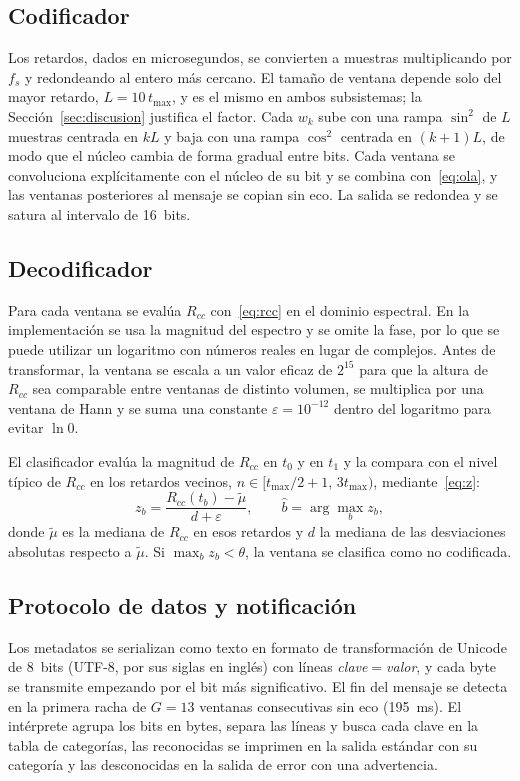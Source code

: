 \documentclass[journal]{IEEEtran}
\begin{document}
\subsection{Codificador}
Los retardos, dados en microsegundos, se convierten a muestras multiplicando por
$f_s$ y redondeando al entero más cercano. El tamaño de ventana depende
solo del mayor retardo, $L=10\,t_{\max}$, y es el mismo en ambos subsistemas;
la Sección~\ref{sec:discusion} justifica el factor. Cada $w_k$ sube con una
rampa $\sin^2$ de $L$ muestras centrada en $kL$ y baja con una rampa $\cos^2$
centrada en $(k+1)L$, de modo que el núcleo cambia de forma gradual entre bits.
Cada ventana se convoluciona explícitamente con el núcleo de su bit y se combina
con~\eqref{eq:ola}, y las ventanas posteriores al mensaje se copian sin eco. La
salida se redondea y se satura al intervalo de 16~bits.

\subsection{Decodificador}
Para cada ventana se evalúa $R_{cc}$ con~\eqref{eq:rcc} en el dominio
espectral. En la implementación se usa la magnitud del espectro y se omite la fase,
por lo que se puede utilizar un logaritmo con números reales en lugar de complejos.
Antes de transformar, la ventana se escala a un valor eficaz de $2^{15}$
para que la altura de $R_{cc}$ sea comparable entre ventanas de distinto
volumen, se multiplica por una ventana de Hann y se suma una constante
$\varepsilon=10^{-12}$ dentro del logaritmo para evitar $\ln 0$.

El clasificador evalúa la magnitud de $R_{cc}$ en $t_0$ y en $t_1$ y la compara
con el nivel típico de $R_{cc}$ en los retardos vecinos,
$n\in[t_{\max}/2+1,\,3t_{\max})$, mediante~\eqref{eq:z}:
\begin{equation}\label{eq:z}
z_b=\frac{R_{cc}(t_b)-\tilde\mu}{d+\varepsilon},\qquad \hat b=\arg\max_b z_b,
\end{equation}
donde $\tilde\mu$ es la mediana de $R_{cc}$ en esos retardos y $d$ la mediana
de las desviaciones absolutas respecto a $\tilde\mu$. Si $\max_b z_b<\theta$,
la ventana se clasifica como no codificada.

\subsection{Protocolo de datos y notificación}
Los metadatos se serializan como texto en formato de transformación de Unicode
de 8~bits (UTF-8, por sus siglas en inglés) con líneas
\emph{clave}$=$\emph{valor}, y cada byte se transmite empezando por el bit más
significativo. El fin del mensaje se detecta en la primera racha de $G=13$
ventanas consecutivas sin eco (195~ms). El intérprete agrupa los bits en bytes, separa
las líneas y busca cada clave en la tabla de categorías, las reconocidas se
imprimen en la salida estándar con su categoría y las desconocidas en la salida
de error con una advertencia.
\end{document}
